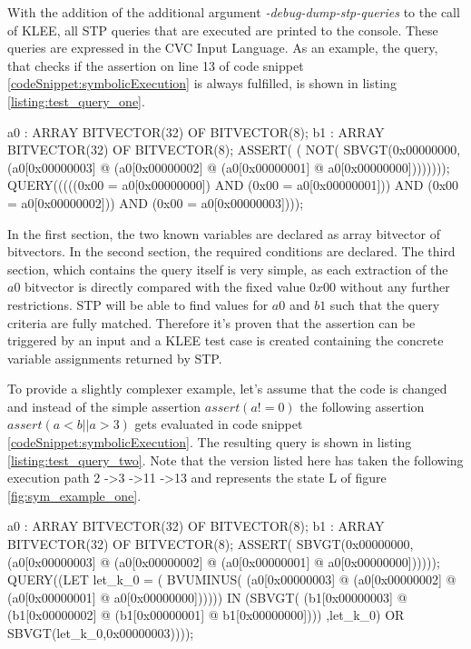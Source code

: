 With the addition of the additional argument \textit{-debug-dump-stp-queries} to the call of KLEE, all STP queries that are executed are printed to the console. These queries are expressed in the CVC Input Language.
As an example, the query, that checks if the assertion on line 13 of code snippet \ref{codeSnippet:symbolicExecution} is always fulfilled, is shown in listing \ref{listing:test_query_one}.

\begin{customlisting}[caption={The query sent to STP when evaluating $assert(a!=0)$ from code snippet \ref{codeSnippet:symbolicExecution} in state J of figure  \ref{fig:sym_example_one}.}, label={listing:test_query_one}]
a0  : ARRAY BITVECTOR(32) OF BITVECTOR(8);
b1  : ARRAY BITVECTOR(32) OF BITVECTOR(8);
ASSERT( ( NOT( SBVGT(0x00000000,
  (a0[0x00000003] @ (a0[0x00000002] @
  (a0[0x00000001] @ a0[0x00000000])))))));
QUERY(((((0x00 = a0[0x00000000]) AND
         (0x00 = a0[0x00000001])) AND
         (0x00 = a0[0x00000002])) AND
         (0x00 = a0[0x00000003])));
\end{customlisting}

In the first section, the two known variables are declared as array bitvector of bitvectors. 
In the second section, the required conditions are declared.
The third section, which contains the query itself is very simple, as each extraction of the $a0$ bitvector is directly compared with the fixed value $0x00$ without any further restrictions.
STP will be able to find values for $a0$ and $b1$ such that the query criteria are fully matched. Therefore it's proven that the assertion can be triggered by an input and a KLEE test case is created containing the concrete variable assignments returned by STP.

To provide a slightly complexer example, let's assume that the code is changed and instead of the simple assertion $assert(a!=0)$ the following assertion $assert(a<b || a > 3)$ gets evaluated in code snippet \ref{codeSnippet:symbolicExecution}. 
The resulting query is shown in listing \ref{listing:test_query_two}. 
Note that the version listed here has taken the following execution path 2 -\textgreater \text{ }3 -\textgreater \text{ }11 -\textgreater \text{ }13 and represents the state L of figure \ref{fig:sym_example_one}. 

\begin{customlisting}[caption={The query sent to STP when evaluating $assert(a<b || a > 3)$ in state L of Figure \ref{fig:sym_example_one}.}, label={listing:test_query_two}]
a0  : ARRAY BITVECTOR(32) OF BITVECTOR(8);
b1  : ARRAY BITVECTOR(32) OF BITVECTOR(8);
ASSERT( SBVGT(0x00000000,
  (a0[0x00000003] @ (a0[0x00000002] @ 
  (a0[0x00000001] @ a0[0x00000000])))));
QUERY((LET let_k_0 = ( BVUMINUS( 
  (a0[0x00000003] @ (a0[0x00000002] @
  (a0[0x00000001] @ a0[0x00000000]))))) IN
(SBVGT(
  (b1[0x00000003] @ (b1[0x00000002] @
  (b1[0x00000001] @ b1[0x00000000])))
  ,let_k_0) 
OR SBVGT(let_k_0,0x00000003))));
\end{customlisting}


